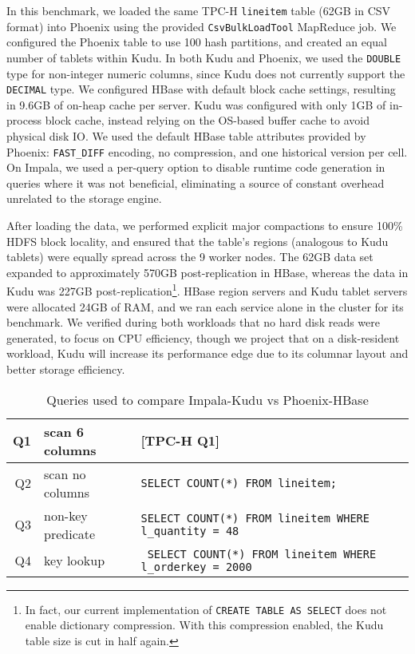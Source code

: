\documentclass[twocolumn,9pt]{article}
\begin{document}
In this benchmark, we loaded the same TPC-H {\tt lineitem} table (62GB in CSV format) into Phoenix
using the provided {\tt CsvBulkLoadTool} MapReduce job. We configured the Phoenix table to use 100
hash partitions, and created an equal number of tablets within Kudu. In both Kudu and Phoenix,
we used the {\tt DOUBLE} type for non-integer numeric columns, since Kudu does not currently
support the {\tt DECIMAL} type. We configured HBase with default block cache settings,
resulting in 9.6GB of on-heap cache per server. Kudu was configured with only 1GB of in-process
block cache, instead relying on the OS-based buffer cache to avoid physical disk IO.
We used the default HBase table attributes provided by Phoenix: {\tt FAST\_DIFF} encoding,
no compression, and one historical version per cell. On Impala, we used a per-query option
to disable runtime code generation in queries where it was not beneficial, eliminating a source
of constant overhead unrelated to the storage engine.

After loading the data, we performed explicit major compactions to ensure 100\% HDFS block locality,
and ensured that the table's regions (analogous to Kudu tablets) were equally spread across
the 9 worker nodes. The 62GB data set expanded to approximately 570GB post-replication
in HBase, whereas the data in Kudu was 227GB post-replication\footnote{In fact, our current
implementation of {\tt CREATE TABLE AS SELECT} does not enable dictionary compression. With
this compression enabled, the Kudu table size is cut in half again.}.
HBase region servers and Kudu tablet servers were allocated 24GB of RAM, and we ran each
service alone in the cluster for its benchmark. We verified during both workloads that
no hard disk reads were generated, to focus on CPU efficiency, though we project that
on a disk-resident workload, Kudu will increase its performance edge due to its columnar
layout and better storage efficiency.

\begin{table}
\begin{tabular}{r|l|l}
  Q1 & scan 6 columns & [TPC-H Q1]\\\hline
  Q2 & scan no columns & {\tt SELECT COUNT(*) FROM lineitem;}\\\hline
  Q3 & non-key predicate & \parbox{2in}{\tt \vspace{0.2em}SELECT COUNT(*) FROM lineitem WHERE l\_quantity = 48\vspace{0.2em}}\\\hline
  Q4 & key lookup        & \parbox{2in}{\tt \vspace{0.2em} SELECT COUNT(*) FROM lineitem WHERE l\_orderkey = 2000}
\end{tabular}
\caption{Queries used to compare Impala-Kudu vs Phoenix-HBase}
\label{tab:phoenix_queries}
\end{table}
\end{document}
